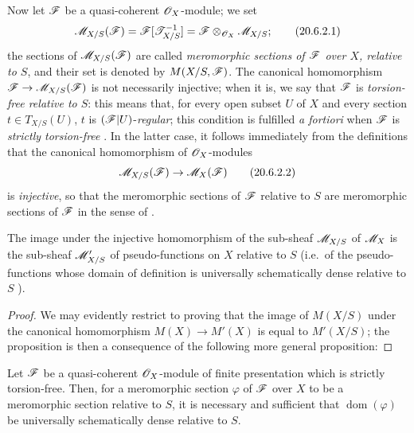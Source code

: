 \begin{env}[20.6.2]\label{IV.20.6.2}
Now let $\mathscr{F}$ be a quasi-coherent $\mathscr{O}_X$-module; we set
\[
\label{IV.20.6.2.1}
  \mathscr{M}_{X/S}(\mathscr{F})=\mathscr{F}[\mathscr{T}_{X/S}^{-1}]=\mathscr{F}\otimes_{\mathscr{O}_X}\mathscr{M}_{X/S};
  \tag{20.6.2.1}
\]
the sections of $\mathscr{M}_{X/S}(\mathscr{F})$ are called \emph{meromorphic sections of $\mathscr{F}$ over $X$, relative to $S$}, and their set is denoted by $M(X/S,\mathscr{F})$.
The canonical homomorphism $\mathscr{F}\to\mathscr{M}_{X/S}(\mathscr{F})$ is not necessarily injective; when it is, we say that $\mathscr{F}$ is \emph{torsion-free relative to $S$}: this means that, for every open subset $U$ of $X$ and every section $t\in T_{X/S}(U)$, $t$ is $(\mathscr{F}|U)$-\emph{regular}; this condition is fulfilled \emph{a fortiori} when $\mathscr{F}$ is \emph{strictly torsion-free} .
In the latter case, it follows immediately from the definitions  that the canonical homomorphism of $\mathscr{O}_X$-modules
\[
\label{IV.20.6.2.2}
  \mathscr{M}_{X/S}(\mathscr{F})\to\mathscr{M}_X(\mathscr{F})
  \tag{20.6.2.2}
\]
is \emph{injective}, so that the meromorphic sections of $\mathscr{F}$ relative to $S$ are meromorphic sections of $\mathscr{F}$ in the sense of .
\end{env}

\begin{proposition}[20.6.3]
\label{IV.20.6.3}
The image under the injective homomorphism  of the sub-sheaf $\mathscr{M}_{X/S}$ of $\mathscr{M}_X$ is the sub-sheaf $\mathscr{M}'_{X/S}$ of pseudo-functions on $X$ relative to $S$ \textup{(i.e.}\ of the pseudo-functions whose domain of definition is universally schematically dense relative to $S$ \textup{)}.
\end{proposition}

\begin{proof}
We may evidently restrict to proving that the image of $M(X/S)$ under the canonical homomorphism $M(X)\to M'(X)$ is equal to $M'(X/S)$; the proposition is then a consequence of the following more general proposition:
\end{proof}

\begin{proposition}[20.6.4]
\label{IV.20.6.4}
Let $\mathscr{F}$ be a quasi-coherent $\mathscr{O}_X$-module of finite presentation which is strictly torsion-free.
Then, for a meromorphic section $\varphi$ of $\mathscr{F}$ over $X$ to be a meromorphic section relative to $S$, it is necessary and sufficient that $\operatorname{dom}(\varphi)$ be universally schematically dense relative to $S$.
\end{proposition}


